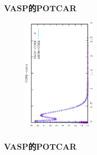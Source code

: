 \frame
{
	\frametitle{\rm{VASP}的\rm{POTCAR}}
\begin{minipage}{0.58\textwidth}
\centering
\vspace{-0.10in}
\fontsize{3.3pt}{1.9pt}\selectfont{
}
\end{minipage}
\hfill
\begin{minipage}{0.40\textwidth}
\begin{figure}[t!]
\centering
\vspace{-0.05in}
\includegraphics[height=2.25in,width=1.5in,viewport=0 0 350 550, angle=-90, clip]{Figures/CORE-data.eps}
\label{core_density_Function}
\end{figure}
\end{minipage}
}

\frame
{
	\frametitle{\rm{VASP}的\rm{POTCAR}}
\centering
\vspace{-0.15in}
\fontsize{3.3pt}{1.9pt}\selectfont{
}
}

